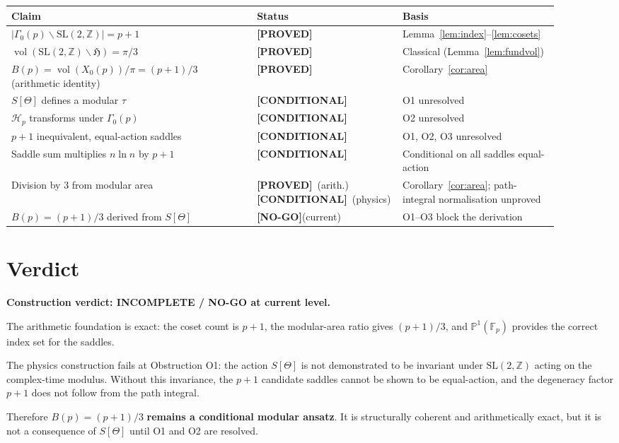 \documentclass[12pt,a4paper]{article}
\theoremstyle{definition}
\theoremstyle{remark}
\newcommand{\PROVED}{\textcolor{green!50!black}{\textbf{[PROVED]}}}
\newcommand{\COND}  {\textcolor{blue!70!black} {\textbf{[CONDITIONAL]}}}
\newcommand{\NOGO}  {\textcolor{red!80!black}  {\textbf{[NO-GO]}}}
\newcommand{\SL}{\mathrm{SL}}
\newcommand{\vol}{\operatorname{vol}}
\newcommand{\bH}{\mathfrak{H}}     %
\newcommand{\ZZ}{\mathbb{Z}}
\newcommand{\FF}{\mathbb{F}}
\newcommand{\PP}{\mathbb{P}}
\newcommand{\Gam}{\Gamma}
\newcommand{\Hp}{\mathcal{H}_p}
\begin{document}
\begin{center}
\renewcommand{\arraystretch}{1.4}
\begin{tabular}{@{}p{0.44\linewidth}p{0.18\linewidth}p{0.28\linewidth}@{}}
\toprule
Claim & Status & Basis \\
\midrule
$|\Gam_0(p)\backslash\SL(2,\ZZ)|=p+1$ &
  \PROVED &
  Lemma~\ref{lem:index}--\ref{lem:cosets} \\
\addlinespace
$\vol(\SL(2,\ZZ)\backslash\bH)=\pi/3$ &
  \PROVED &
  Classical (Lemma~\ref{lem:fundvol}) \\
\addlinespace
$B(p)=\vol(X_0(p))/\pi=(p+1)/3$ (arithmetic identity) &
  \PROVED &
  Corollary~\ref{cor:area} \\
\addlinespace
$S[\Theta]$ defines a modular $\tau$ &
  \COND &
  O1 unresolved \\
\addlinespace
$\Hp$ transforms under $\Gam_0(p)$ &
  \COND &
  O2 unresolved \\
\addlinespace
$p+1$ inequivalent, equal-action saddles &
  \COND &
  O1, O2, O3 unresolved \\
\addlinespace
Saddle sum multiplies $n\ln n$ by $p+1$ &
  \COND &
  Conditional on all saddles equal-action \\
\addlinespace
Division by $3$ from modular area &
  \PROVED\ (arith.) \COND\ (physics) &
  Corollary~\ref{cor:area};  path-integral normalisation unproved \\
\addlinespace
$B(p)=(p+1)/3$ derived from $S[\Theta]$ &
  \NOGO (current) &
  O1--O3 block the derivation \\
\bottomrule
\end{tabular}
\end{center}

\section{Verdict}
\label{sec:verdict}

\begin{warnbox}
\textbf{Construction verdict: INCOMPLETE / NO-GO at current level.}

The arithmetic foundation is exact: the coset count is $p+1$, the
modular-area ratio gives $(p+1)/3$, and $\PP^1(\FF_p)$ provides the
correct index set for the saddles.

The physics construction fails at Obstruction O1: the action $S[\Theta]$
is not demonstrated to be invariant under $\SL(2,\ZZ)$ acting on the
complex-time modulus.  Without this invariance, the $p+1$ candidate
saddles cannot be shown to be equal-action, and the degeneracy factor
$p+1$ does not follow from the path integral.

Therefore $B(p)=(p+1)/3$ \textbf{remains a conditional modular ansatz}.
It is structurally coherent and arithmetically exact, but it is not a
consequence of $S[\Theta]$ until O1 and O2 are resolved.
\end{warnbox}
\end{document}
